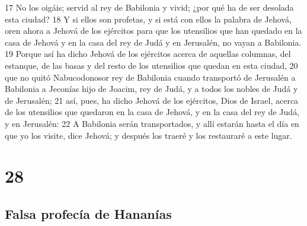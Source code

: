 17 No los oigáis; servid al rey de Babilonia y vivid; ¿por qué ha de ser desolada esta ciudad?
18 Y si ellos son profetas, y si está con ellos la palabra de Jehová, oren ahora a Jehová de los ejércitos para que los utensilios que han quedado en la casa de Jehová y en la casa del rey de Judá y en Jerusalén, no vayan a Babilonia.
19 Porque así ha dicho Jehová de los ejércitos acerca de aquellas columnas, del estanque, de las basas y del resto de los utensilios que quedan en esta ciudad,
20 que no quitó Nabucodonosor rey de Babilonia cuando transportó de Jerusalén a Babilonia a Jeconías hijo de Joacim, rey de Judá, y a todos los nobles de Judá y de Jerusalén;
21 así, pues, ha dicho Jehová de los ejércitos, Dios de Israel, acerca de los utensilios que quedaron en la casa de Jehová, y en la casa del rey de Judá, y en Jerusalén:
22 A Babilonia serán transportados, y allí estarán hasta el día en que yo los visite, dice Jehová; y después los traeré y los restauraré a este lugar. 

\chapter{28}

\section*{Falsa profecía de Hananías}

